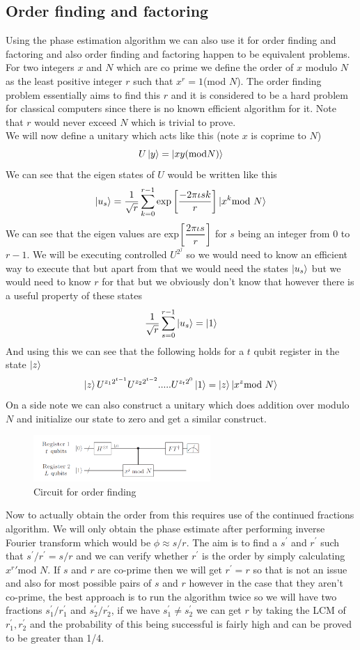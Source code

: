 \documentclass{report}
\begin{document}
\subsection{Order finding and factoring}
Using the phase estimation algorithm we can also use it for order finding and factoring and also order finding and factoring happen to be equivalent problems. For two integers $x$ and $N$ which are co prime we define the order of $x$ modulo $N$ as the least positive integer $r$ such that $x^{r} = 1$(mod $N$). The order finding problem essentially aims to find this $r$ and it is considered to be a hard problem for classical computers since there is no known efficient algorithm for it. Note that $r$ would never exceed $N$ which is trivial to prove.\\
We will now define a unitary which acts like this (note $x$ is coprime to $N$)
$$U\ket{y} = \ket{xy(\text{mod}N)}$$
We can see that the eigen states of $U$ would be written like this
$$\ket{u_s} = \dfrac{1}{\sqrt{r}}\sum_{k = 0}^{r-1}\text{exp}\left[\dfrac{-2\pi\iota{sk}}{r}\right]\ket{x^{k}\text{mod }N}$$
We can see that the eigen values are exp$\left[\dfrac{2\pi\iota{s}}{r}\right]$ for $s$ being an integer from $0$ to $r-1$. We will be executing controlled $U^{2^j}$ so we would need to know an efficient way to execute that but apart from that we would need the states $\ket{u_s}$ but we would need to know $r$ for that but we obviously don't know that however there is a useful property of these states $$\dfrac{1}{\sqrt{r}}\sum_{s = 0}^{r-1}\ket{u_s} = \ket{1}$$
And using this we can see that the following holds for a $t$ qubit register in the state $\ket{z}$ 
$$\ket{z}U^{z_{1}2^{t-1}}U^{z_{2}2^{t-2}}.....U^{z_{t}2^{0}}\ket{1} = \ket{z}\ket{x^z\text{mod }N}$$
On a side note we can also construct a unitary which does addition over modulo $N$ and initialize our state to zero and get a similar construct.
\begin{figure}[ht]
    \centering
    \includegraphics[width = 0.6\textwidth]{images/order finding.png}
    \caption{Circuit for order finding}
\end{figure}
Now to actually obtain the order from this requires use of the continued fractions algorithm. We will only obtain the phase estimate after performing inverse Fourier transform which would be $\phi \approx s/r$. The aim is to find a $s^{'}$ and $r^{'}$ such that $s^{'}/r^{'} = s/r$ and we can verify whether $r^{'}$ is the order by simply calculating $x^r{'}$mod $N$. If $s$ and $r$ are co-prime then we will get $r^{'} = r$ so that is not an issue and also for most possible pairs of $s$ and $r$ however in the case that they aren't co-prime, the best approach is to run the algorithm twice so we will have two fractions $s_{1}^{'}/r_{1}^{'}$ and $s_{2}^{'}/r_{2}^{'}$, if we have $s_{1}^{'} \neq s_{2}^{'}$ we can get $r$ by taking the LCM of $r_{1}^{'},r_{2}^{'}$ and the probability of this being successful is fairly high and can be proved to be greater than 1/4.\\
\end{document}
